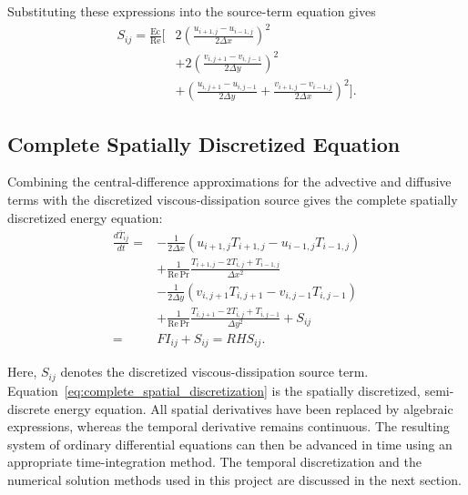 Substituting these expressions into the source-term equation
gives
\begin{equation}
\begin{aligned}
S_{ij}
=
\frac{\mathrm{Ec}}{\mathrm{Re}}
\Bigg[
&2\left(
\frac{u_{i+1,j}-u_{i-1,j}}{2\Delta x}
\right)^2
\\
&+2\left(
\frac{v_{i,j+1}-v_{i,j-1}}{2\Delta y}
\right)^2
\\
&+\left(
\frac{u_{i,j+1}-u_{i,j-1}}{2\Delta y}
+
\frac{v_{i+1,j}-v_{i-1,j}}{2\Delta x}
\right)^2
\Bigg].
\end{aligned}
\label{eq:discrete_viscous_source}
\end{equation}

\subsection{Complete Spatially Discretized Equation}

Combining the central-difference approximations for the
advective and diffusive terms with the discretized
viscous-dissipation source gives the complete
spatially discretized energy equation:
\begin{equation}
\boxed{
\begin{aligned}
\frac{d\overline{T}_{ij}}{dt}
={}&
-\frac{1}{2\Delta x}
\left(
u_{i+1,j}T_{i+1,j}
-u_{i-1,j}T_{i-1,j}
\right)
\\[0.15cm]
&+
\frac{1}{\mathrm{Re}\,\mathrm{Pr}}
\frac{
T_{i+1,j}-2T_{i,j}+T_{i-1,j}
}{\Delta x^2}
\\[0.15cm]
&-
\frac{1}{2\Delta y}
\left(
v_{i,j+1}T_{i,j+1}
-v_{i,j-1}T_{i,j-1}
\right)
\\[0.15cm]
&+
\frac{1}{\mathrm{Re}\,\mathrm{Pr}}
\frac{
T_{i,j+1}-2T_{i,j}+T_{i,j-1}
}{\Delta y^2}
+S_{ij}
\\[0.15cm]
={}& FI_{ij}+S_{ij}
=RHS_{ij}.
\end{aligned}
}
\label{eq:complete_spatial_discretization}
\end{equation}

Here, $S_{ij}$ denotes the discretized viscous-dissipation
source term. Equation~\eqref{eq:complete_spatial_discretization}
is the spatially discretized, semi-discrete energy equation.
All spatial derivatives have been replaced by algebraic
expressions, whereas the temporal derivative remains
continuous. The resulting system of ordinary differential
equations can then be advanced in time using an appropriate
time-integration method. The temporal discretization and
the numerical solution methods used in this project are
discussed in the next section.


